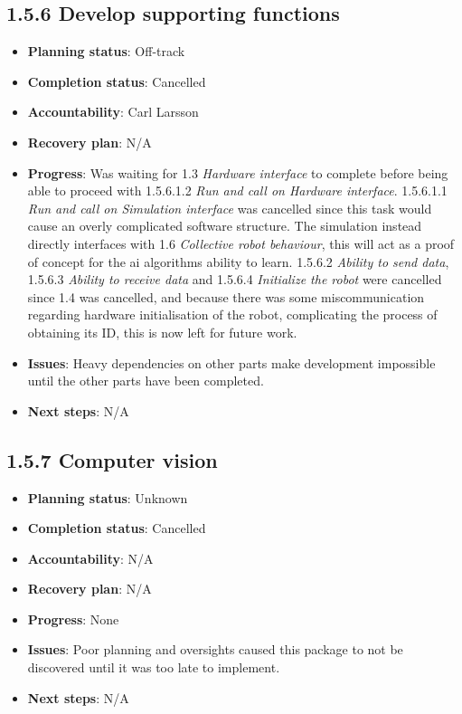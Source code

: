 \subsection*{1.5.6 Develop supporting functions}
\begin{itemize}
    \item \textbf{Planning status}: Off-track
    \item \textbf{Completion status}: Cancelled
    \item \textbf{Accountability}: Carl Larsson
    \item \textbf{Recovery plan}: N/A
    \item \textbf{Progress}: Was waiting for 1.3 \textit{Hardware interface} to complete before being able to proceed with 1.5.6.1.2 \textit{Run and call on Hardware interface}. 1.5.6.1.1 \textit{Run and call on Simulation interface} was cancelled since this task would cause an overly complicated software structure. The simulation instead directly interfaces with 1.6 \textit{Collective robot behaviour}, this will act as a proof of concept for the \ac{ai} algorithms ability to learn. 1.5.6.2 \textit{Ability to send data}, 1.5.6.3 \textit{Ability to receive data} and 1.5.6.4 \textit{Initialize the robot} were cancelled since 1.4 was cancelled, and because there was some miscommunication regarding hardware initialisation of the robot, complicating the process of obtaining its ID, this is now left for future work.
    \item \textbf{Issues}: Heavy dependencies on other parts make development impossible until the other parts have been completed.
    \item \textbf{Next steps}: N/A
\end{itemize}


\subsection*{1.5.7 Computer vision}
\begin{itemize}
    \item \textbf{Planning status}: Unknown
    \item \textbf{Completion status}: Cancelled
    \item \textbf{Accountability}: N/A
    \item \textbf{Recovery plan}: N/A
    \item \textbf{Progress}: None
    \item \textbf{Issues}: Poor planning and oversights caused this package to not be discovered until it was too late to implement.
    \item \textbf{Next steps}: N/A
\end{itemize}

